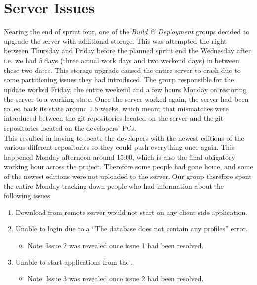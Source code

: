
\section{Server Issues} 
\label{sec:server_issues}

Nearing the end of sprint four, one of the \emph{Build \& Deployment} groups decided to upgrade the server with additional storage. This was attempted the night between Thursday and Friday before the planned sprint end the Wednesday after, i.e. we had 5 days (three actual work days and two weekend days) in between these two dates. This storage upgrade caused the entire server to crash due to some partitioning issues they had introduced. The group responsible for the update worked Friday, the entire weekend and a few hours Monday on restoring the server to a working state. Once the server worked again, the server had been rolled back its state around 1.5 weeks, which meant that mismatches were introduced between the git repositories located on the server and the git repositories located on the developers' PCs. \\

This resulted in having to locate the developers with the newest editions of the various different repositories so they could push everything once again. This happened Monday afternoon around 15:00, which is also the final obligatory working hour across the project. Therefore some people had gone home, and some of the newest editions were not uploaded to the server. Our group therefore spent the entire Monday tracking down people who had information about the following issues: \\

\begin{enumerate}
    \item Download from remote server would not start on any client side application.
    \item Unable to login due to a ``The database does not contain any profiles'' error.
    \begin{itemize}
        \item Note: Issue 2 was revealed once issue 1 had been resolved.
    \end{itemize}
    \item Unable to start applications from the \launcher.   
    \begin{itemize}
        \item Note: Issue 3 was revealed once issue 2 had been resolved. 
    \end{itemize}
\end{enumerate}

